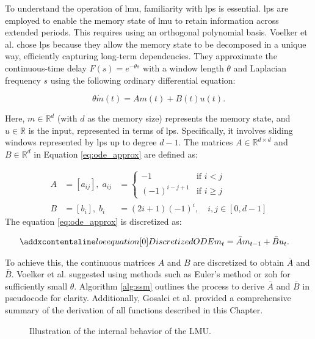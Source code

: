 To understand the operation of \gls{lmu}, familiarity with \glspl{lp} is essential. \glspl{lp} are employed to enable the memory state of \gls{lmu} to retain information across extended periods. This requires using an orthogonal polynomial basis. Voelker et al. chose \glspl{lp} because they allow the memory state to be decomposed in a unique way, efficiently capturing long-term dependencies. They approximate the continuous-time delay \( F(s) = e^{-\theta s} \) with a window length \( \theta \) and Laplacian frequency \( s \) using the following ordinary differential equation:

\begin{equation}
\label{eq:ode_approx}
    \theta \dot{m}(t) = Am(t) + B(t)u(t).
\end{equation}
\label{eq:ode_approx_caption}

Here, \( m \in \mathbb{R}^d \) (with \( d \) as the memory size) represents the memory state, and \( u \in \mathbb{R} \) is the input, represented in terms of \glspl{lp}. Specifically, it involves sliding windows represented by \glspl{lp} up to degree \( d-1 \). The matrices \( A \in \mathbb{R}^{d \times d} \) and \( B \in \mathbb{R}^{d} \) in Equation \eqref{eq:ode_approx} are defined as:

\begin{align}
    \label{eq:a_bar}
    A &= \left[a_{ij}\right], \; a_{ij} &= \begin{cases} 
    -1 & \text{if } i < j \\
    (-1)^{i-j+1} & \text{if } i \geq j
    \end{cases} \\
    \label{eq:b_bar}
    B &= \left[b_i\right], \; b_i &= (2i + 1)(-1)^i, \quad i, j \in [0, d-1]
\end{align}
The equation \eqref{eq:ode_approx} is discretized as:

\begin{align}
\setequationentry{Discretized ODE}
    m_t &= \Bar{A}m_{t-1} + \Bar{B}u_t.
\end{align}

To achieve this, the continuous matrices \( A \) and \( B \) are discretized to obtain \( \bar{A} \) and \( \bar{B} \). Voelker et al. suggested using methods such as Euler's method or \gls*{zoh} for sufficiently small \( \theta \). Algorithm \ref{alg:ssm} outlines the process to derive \( \bar{A} \) and \( \bar{B} \) in pseudocode for clarity. Additionally, Gosalci et al. \cite{gosalci} provided a comprehensive summary of the derivation of all functions described in this Chapter.
\begin{figure}[t]
    \centering
    
    \caption{Illustration of the internal behavior of the LMU.}    
    \label{fig:lmu}
\end{figure}

